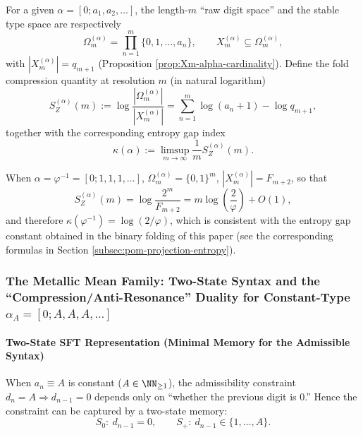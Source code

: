 \begin{definition}\label{def:ostrowski-entropy-gap}
For a given $\alpha=[0;a_1,a_2,\dots]$, the length-$m$ ``raw digit space'' and the stable type space are respectively
\[
\Omega_m^{(\alpha)}=\prod_{n=1}^{m}\{0,1,\dots,a_n\},
\qquad
X_m^{(\alpha)}\subseteq \Omega_m^{(\alpha)},
\]
with $|X_m^{(\alpha)}|=q_{m+1}$ (Proposition \ref{prop:Xm-alpha-cardinality}).
Define the fold compression quantity at resolution $m$ (in natural logarithm)
\[
S_Z^{(\alpha)}(m):=\log\frac{|\Omega_m^{(\alpha)}|}{|X_m^{(\alpha)}|}
=\sum_{n=1}^{m}\log(a_n+1)-\log q_{m+1},
\]
together with the corresponding entropy gap index
\[
\kappa(\alpha):=\limsup_{m\to\infty}\frac{1}{m}S_Z^{(\alpha)}(m).
\]
\end{definition}

\begin{remark}
When $\alpha=\varphi^{-1}=[0;1,1,1,\dots]$, $\Omega_m^{(\alpha)}=\{0,1\}^m$, $|X_m^{(\alpha)}|=F_{m+2}$, so that
\[
S_Z^{(\alpha)}(m)=\log\frac{2^m}{F_{m+2}}
=m\log\!\left(\frac{2}{\varphi}\right)+O(1),
\]
and therefore $\kappa(\varphi^{-1})=\log(2/\varphi)$, which is consistent with the entropy gap constant obtained in the binary folding of this paper (see the corresponding formulas in Section \ref{subsec:pom-projection-entropy}).
\end{remark}

\subsubsection{The Metallic Mean Family: Two-State Syntax and the ``Compression/Anti-Resonance'' Duality for Constant-Type \texorpdfstring{$\alpha_A=[0;A,A,A,\dots]$}{alphaA}}

\paragraph{Two-State SFT Representation (Minimal Memory for the Admissible Syntax)}
When $a_n\equiv A$ is constant ($A\in\NN_{\ge 1}$), the admissibility constraint
\(
d_n=A\Rightarrow d_{n-1}=0
\)
depends only on ``whether the previous digit is $0$.'' Hence the constraint can be captured by a two-state memory:
\[
S_0:\ d_{n-1}=0,\qquad S_+:\ d_{n-1}\in\{1,\dots,A\}.
\]

